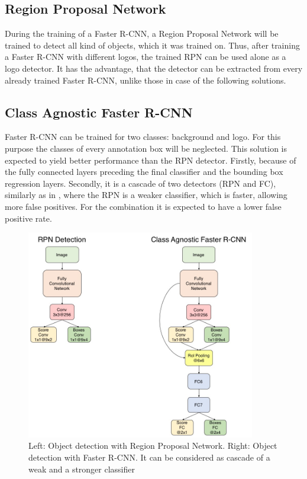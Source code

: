\subsection{Region Proposal Network}
During the training of a Faster R-CNN, a Region Proposal Network will be trained to detect all kind of objects, which it was trained on. Thus, after training a Faster R-CNN with different logos, the trained RPN can be used alone as a logo detector. It has the advantage, that the detector can be extracted from every already trained Faster R-CNN, unlike those in case of the following solutions.
\bigbreak
\subsection{Class Agnostic Faster R-CNN}\label{ss:classagnosticdetector}
Faster R-CNN can be trained for two classes: background and logo. For this purpose the classes of every annotation box will be neglected. This solution is expected to yield better performance than the RPN detector. Firstly, because of the fully connected layers preceding the final classifier and the bounding box regression layers. Secondly, it is a cascade of two detectors (RPN and FC), similarly as in \cite{Viola:2004:RRF:966432.966458}, where the RPN is a weaker classifier, which is faster, allowing more false positives. For the combination it is expected to have a lower false positive rate.
\begin{figure}
  \centering
  \includegraphics[width=100mm]{images/mt/detectors.jpg}
  \caption{Left: Object detection with Region Proposal Network. Right: Object detection with Faster R-CNN. It can be considered as cascade of a weak and a stronger classifier}
  \label{f:detectors}
\end{figure}
